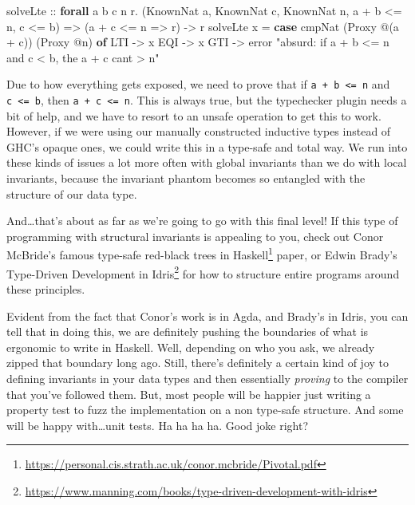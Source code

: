 \documentclass[]{article}
\newenvironment{Shaded}{}{}
\newcommand{\DataTypeTok}[1]{\textcolor[rgb]{0.56,0.13,0.00}{#1}}
\newcommand{\FunctionTok}[1]{\textcolor[rgb]{0.02,0.16,0.49}{#1}}
\newcommand{\KeywordTok}[1]{\textcolor[rgb]{0.00,0.44,0.13}{\textbf{#1}}}
\newcommand{\NormalTok}[1]{#1}
\newcommand{\OperatorTok}[1]{\textcolor[rgb]{0.40,0.40,0.40}{#1}}
\newcommand{\OtherTok}[1]{\textcolor[rgb]{0.00,0.44,0.13}{#1}}
\newcommand{\StringTok}[1]{\textcolor[rgb]{0.25,0.44,0.63}{#1}}
\renewcommand{\href}[2]{#2\footnote{\url{#1}}}
\begin{document}
\begin{Shaded}
\begin{Highlighting}[]
\OtherTok{solveLte ::}
  \KeywordTok{forall}\NormalTok{ a b c n r}\OperatorTok{.}
\NormalTok{  (}\DataTypeTok{KnownNat}\NormalTok{ a, }\DataTypeTok{KnownNat}\NormalTok{ c, }\DataTypeTok{KnownNat}\NormalTok{ n, a }\OperatorTok{+}\NormalTok{ b }\OperatorTok{\textless{}=}\NormalTok{ n, c }\OperatorTok{\textless{}=}\NormalTok{ b) }\OtherTok{=\textgreater{}}
\NormalTok{  (a }\OperatorTok{+}\NormalTok{ c }\OperatorTok{\textless{}=}\NormalTok{ n }\OtherTok{=\textgreater{}}\NormalTok{ r) }\OtherTok{{-}\textgreater{}}
\NormalTok{  r}
\NormalTok{solveLte x }\OtherTok{=} \KeywordTok{case}\NormalTok{ cmpNat (}\DataTypeTok{Proxy} \OperatorTok{@}\NormalTok{(a }\OperatorTok{+}\NormalTok{ c)) (}\DataTypeTok{Proxy} \OperatorTok{@}\NormalTok{n) }\KeywordTok{of}
  \DataTypeTok{LTI} \OtherTok{{-}\textgreater{}}\NormalTok{ x}
  \DataTypeTok{EQI} \OtherTok{{-}\textgreater{}}\NormalTok{ x}
  \DataTypeTok{GTI} \OtherTok{{-}\textgreater{}} \FunctionTok{error} \StringTok{"absurd: if a + b \textless{}= n and c \textless{} b, the a + c can\textquotesingle{}t \textgreater{} n"}
\end{Highlighting}
\end{Shaded}

Due to how everything gets exposed, we need to prove that if
\texttt{a\ +\ b\ \textless{}=\ n} and \texttt{c\ \textless{}=\ b}, then
\texttt{a\ +\ c\ \textless{}=\ n}. This is always true, but the typechecker
plugin needs a bit of help, and we have to resort to an unsafe operation to get
this to work. However, if we were using our manually constructed inductive types
instead of GHC's opaque ones, we could write this in a type-safe and total way.
We run into these kinds of issues a lot more often with global invariants than
we do with local invariants, because the invariant phantom becomes so entangled
with the structure of our data type.

And\ldots that's about as far as we're going to go with this final level! If
this type of programming with structural invariants is appealing to you, check
out Conor McBride's famous
\href{https://personal.cis.strath.ac.uk/conor.mcbride/Pivotal.pdf}{type-safe
red-black trees in Haskell} paper, or Edwin Brady's
\href{https://www.manning.com/books/type-driven-development-with-idris}{Type-Driven
Development in Idris} for how to structure entire programs around these
principles.

Evident from the fact that Conor's work is in Agda, and Brady's in Idris, you
can tell that in doing this, we are definitely pushing the boundaries of what is
ergonomic to write in Haskell. Well, depending on who you ask, we already zipped
that boundary long ago. Still, there's definitely a certain kind of joy to
defining invariants in your data types and then essentially \emph{proving} to
the compiler that you've followed them. But, most people will be happier just
writing a property test to fuzz the implementation on a non type-safe structure.
And some will be happy with\ldots unit tests. Ha ha ha ha. Good joke right?
\end{document}
